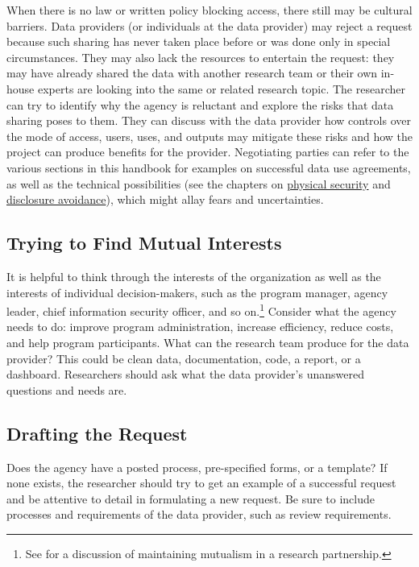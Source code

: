 When there is no law or written policy blocking access, there still may be cultural barriers. Data providers (or individuals at the data provider) may reject a request because such sharing has never taken place before or was done only in special circumstances. They may also lack the resources to entertain the request: they may have already shared the data with another research team or their own in-house experts are looking into the same or related research topic. The researcher can try to identify why the agency is reluctant and explore the risks that data sharing poses to them. They can discuss with the data provider how controls over the mode of access, users, uses, and outputs may mitigate these risks and how the project can produce benefits for the provider. Negotiating parties can refer to the various sections in this handbook for examples on successful data use agreements, as well as the technical possibilities (see the chapters on \protect\hyperlink{security}{physical security} and \protect\hyperlink{discavoid}{disclosure avoidance}), which might allay fears and uncertainties.

\hypertarget{trying-to-find-mutual-interests}{%
\subsection{Trying to Find Mutual Interests}\label{trying-to-find-mutual-interests}}

It is helpful to think through the interests of the organization as well as the interests of individual decision-makers, such as the program manager, agency leader, chief information security officer, and so on.\footnote{See \citet{coburn2013} for a discussion of maintaining mutualism in a research partnership.} Consider what the agency needs to do: improve program administration, increase efficiency, reduce costs, and help program participants. What can the research team produce for the data provider? This could be clean data, documentation, code, a report, or a dashboard. Researchers should ask what the data provider's unanswered questions and needs are.

\hypertarget{drafting-the-request}{%
\subsection{Drafting the Request}\label{drafting-the-request}}

Does the agency have a posted process, pre-specified forms, or a template? If none exists, the researcher should try to get an example of a successful request and be attentive to detail in formulating a new request. Be sure to include processes and requirements of the data provider, such as review requirements.

